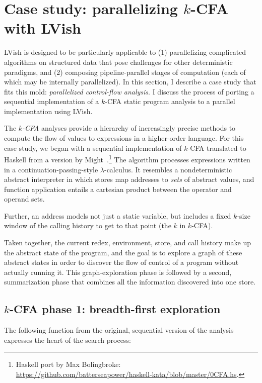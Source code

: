 \section{Case study: parallelizing $k$-CFA with LVish}\label{s:lvish-k-cfa}

LVish is designed to be particularly applicable to (1) parallelizing
complicated algorithms on structured data that pose challenges for
other deterministic paradigms, and (2) composing pipeline-parallel
stages of computation (each of which may be internally parallelized).
In this section, I describe a case study that fits this mold:
\emph{parallelized control-flow analysis}.  I discuss the process of
porting a sequential implementation of a $k$-CFA static program
analysis to a parallel implementation using LVish.

The \emph{$k$-CFA} analyses provide a hierarchy of increasingly
precise methods to compute the flow of values to expressions in a
higher-order language.  For this case study, we began with a
sequential implementation of $k$-CFA translated to Haskell from a
version by Might~\cite{MightkCFABlog}.\footnote{Haskell port by Max
  Bolingbroke:
  \url{https://github.com/batterseapower/haskell-kata/blob/master/0CFA.hs}.}
The algorithm processes expressions written in a
continuation-passing-style $\lambda$-calculus.  It resembles a
nondeterministic abstract interpreter in which stores map addresses to
\emph{sets} of abstract values, and function application entails a
cartesian product between the operator and operand sets.

Further, an address models not just a static variable, but includes a
fixed $k$-size window of the calling history to get to that point (the
$k$ in $k$-CFA).

Taken together, the current redex, environment, store, and call
history make up the abstract state of the program, and the goal is to
explore a graph of these abstract states in order to discover the flow
of control of a program without actually running it.  This
graph-exploration phase is followed by a second, summarization phase
that combines all the information discovered into one store.

\subsection{$k$-CFA phase 1: breadth-first exploration}

The following function from the original, sequential version of the
analysis expresses the heart of the search process:

